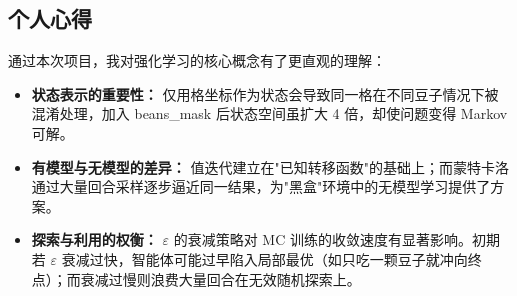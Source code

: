 \documentclass[12pt,a4paper]{ctexart}
\begin{document}
\subsection{个人心得}
通过本次项目，我对强化学习的核心概念有了更直观的理解：

\begin{itemize}
    \item \textbf{状态表示的重要性：} 仅用格坐标作为状态会导致同一格在不同豆子情况下被混淆处理，加入 beans\_mask 后状态空间虽扩大 4 倍，却使问题变得 Markov 可解。
    \item \textbf{有模型与无模型的差异：} 值迭代建立在"已知转移函数"的基础上；而蒙特卡洛通过大量回合采样逐步逼近同一结果，为"黑盒"环境中的无模型学习提供了方案。
    \item \textbf{探索与利用的权衡：} $\varepsilon$ 的衰减策略对 MC 训练的收敛速度有显著影响。初期若 $\varepsilon$ 衰减过快，智能体可能过早陷入局部最优（如只吃一颗豆子就冲向终点）；而衰减过慢则浪费大量回合在无效随机探索上。
\end{itemize}
\end{document}
